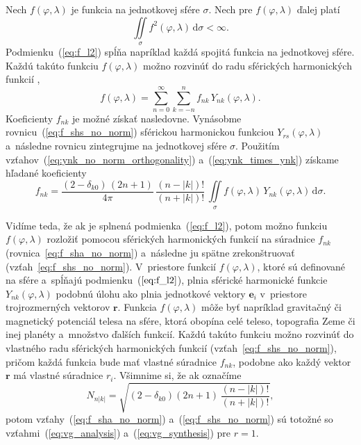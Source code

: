 \documentclass[a4paper, 12pt]{book}
\newcommand{\diff}{\mathrm d}
\let\vec\mathbf
\begin{document}
Nech $f(\varphi, \lambda)$ je funkcia na jednotkovej sfére $\sigma$.  Nech pre
$f(\varphi, \lambda)$ ďalej platí
%
\begin{equation}
\label{eq:f_l2}
\iint\limits_\sigma f^2(\varphi, \lambda) \, \diff \sigma < \infty{.}
\end{equation}
%
Podmienku~(\ref{eq:f_l2}) spĺňa napríklad každá spojitá funkcia na jednotkovej
sfére.  Každú takúto funkciu $f(\varphi, \lambda)$ možno rozvinúť do radu
sférických harmonických funkcií \parencite[napríklad][]{MoritzPhysicalGeodesy},
%
\begin{equation}
\label{eq:f_shs_no_norm}
f(\varphi, \lambda) = \sum_{n = 0}^\infty \sum_{k = -n}^n f_{nk} \,
Y_{nk}(\varphi, \lambda){.}
\end{equation}
%
Koeficienty $f_{nk}$ je možné získať nasledovne.  Vynásobme 
rovnicu~(\ref{eq:f_shs_no_norm}) sférickou harmonickou funkciou 
$Y_{rs}(\varphi, \lambda)$ a~následne rovnicu zintegrujme na jednotkovej sfére 
$\sigma$.  Použitím vzťahov~(\ref{eq:ynk_no_norm_orthogonality}) 
a~(\ref{eq:ynk_times_ynk}) získame hľadané koeficienty
%
\begin{equation}
\label{eq:f_sha_no_norm}
f_{nk} = \frac{(2 - \delta_{k0}) \, (2n + 1)}{4\pi} \, \frac{(n - |k|)!}{(n 
+ |k|)!} \, \iint\limits_{\sigma} f(\varphi, \lambda) \, Y_{nk}(\varphi, 
\lambda) \, \diff \sigma{.}
\end{equation}

Vidíme teda, že ak je splnená podmienka~(\ref{eq:f_l2}), potom možno 
funkciu~$f(\varphi, \lambda)$ rozložiť pomocou sférických harmonických funkcií 
na súradnice $f_{nk}$ (rovnica~\ref{eq:f_sha_no_norm}) a~následne ju spätne 
zrekonštruovať (vzťah~\ref{eq:f_shs_no_norm}).  V~priestore funkcií $f(\varphi, 
\lambda)$, ktoré sú definované na sfére a~spĺňajú podmienku~($\ref{eq:f_l2}$), 
plnia sférické harmonické funkcie $Y_{nk}(\varphi, \lambda)$ podobnú úlohu ako 
plnia jednotkové vektory $\vec e_i$ v~priestore trojrozmerných vektorov $\vec 
r$.  Funkcia $f(\varphi,\lambda)$ môže byť napríklad gravitačný či magnetický 
potenciál telesa na sfére, ktorá obopína celé teleso, topografia Zeme či inej 
planéty a~množstvo ďalších funkcií.  Každú takúto funkciu možno rozvinúť do 
vlastného radu sférických harmonických funkcií (vzťah~\ref{eq:f_shs_no_norm}), 
pričom každá funkcia bude mať vlastné súradnice $f_{nk}$, podobne ako každý 
vektor $\vec r$ má vlastné súradnice $r_i$.  Všimnime si, že ak označíme
%
\begin{equation}
\label{eq:sh_norm}
N_{n|k|} = \sqrt{(2 - \delta_{k0}) (2n + 1) \, \frac{(n - |k|)!}{(n
+ |k|)!}}{,}
\end{equation}
%
potom vzťahy~(\ref{eq:f_sha_no_norm}) a~(\ref{eq:f_shs_no_norm}) sú totožné so
vzťahmi~(\ref{eq:vg_analysis}) a~(\ref{eq:vg_synthesis}) pre $r = 1$.
\end{document}

